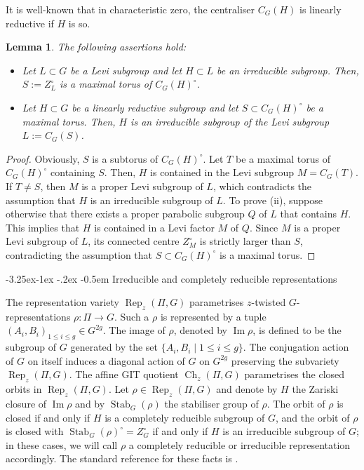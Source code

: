 \documentclass[11pt,oneside,dvipsnames]{amsart}
\makeatletter
\renewcommand\subsection{\@startsection{subsection}{3}{\z@}%
                                     {-3.25ex\@plus -1ex \@minus -.2ex}%
                                     {-0.5em}%
                                     {\normalfont\normalsize\bfseries}}
\theoremstyle{plain}
\newtheorem{Lem}[Thm]{Lemma}
\theoremstyle{definition}
\theoremstyle{named}
\DeclareMathOperator{\Ch}{Ch}
\DeclareMathOperator{\Ima}{Im}
\DeclareMathOperator{\Rep}{Rep}
\DeclareMathOperator{\Stab}{Stab}
\makeatother
\begin{document}
It is well-known that in characteristic zero, the centraliser $C_G(H)$ is linearly reductive if $H$ is so.
\begin{Lem}\label{Lem-S<C_G(H)}
The following assertions hold:
\begin{itemize}
\item[(i)] Let $L\subset G$ be a Levi subgroup and let $H\subset L$ be an irreducible subgroup. Then, $S:=Z_L^{\circ}$ is a maximal torus of $C_G(H)^{\circ}$. 
\item[(ii)] Let $H\subset G$ be a linearly reductive subgroup and let $S\subset C_G(H)^{\circ}$ be a maximal torus. Then, $H$ is an irreducible subgroup of the Levi subgroup $L:=C_G(S)$.
\end{itemize}
\end{Lem}
\begin{proof}
Obviously, $S$ is a subtorus of $C_G(H)^{\circ}$. Let $T$ be a maximal torus of $C_G(H)^{\circ}$ containing $S$. Then, $H$ is contained in the Levi subgroup $M=C_G(T)$. If $T\ne S$, then $M$ is a proper Levi subgroup of $L$, which contradicts the assumption that $H$ is an irreducible subgroup of $L$. To prove (ii), suppose otherwise that there exists a proper parabolic subgroup $Q$ of $L$ that contains $H$. This implies that $H$ is contained in a Levi factor $M$ of $Q$. Since $M$ is a proper Levi subgroup of $L$, its connected centre $Z_M^{\circ}$ is strictly larger than $S$, contradicting the assumption that $S\subset C_G(H)^{\circ}$ is a maximal torus.
\end{proof}

\subsection{Irreducible and completely reducible representations}\label{subsec-rep-char}\hfill

The representation variety $\Rep_z(\Pi,G)$ parametrises $z$-twisted $G$-representations $\rho:\Pi\rightarrow G$. Such a $\rho$ is represented by a tuple $(A_i,B_i)_{1\le i\le g}\in G^{2g}$. The image of $\rho$, denoted by $\Ima\rho$, is defined to be the subgroup of $G$ generated by the set $\{A_i,B_i\mid 1\le i\le g\}$. The conjugation action of $G$ on itself induces a diagonal action of $G$ on $G^{2g}$ preserving the subvariety $\Rep_z(\Pi,G)$. The affine GIT quotient $\Ch_z(\Pi,G)$ parametrises the closed orbits in $\Rep_z(\Pi,G)$. Let $\rho\in \Rep_z(\Pi,G)$ and denote by $H$ the Zariski closure of $\Ima\rho$ and by $\Stab_G(\rho)$ the stabiliser group of $\rho$. The orbit of $\rho$ is closed if and only if $H$ is a completely reducible subgroup of $G$, and the orbit of $\rho$ is closed with $\Stab_G(\rho)^{\circ}=Z_G^{\circ}$ if and only if $H$ is an irreducible subgroup of $G$; in these cases, we will call $\rho$ a completely reducible or irreducible representation accordingly. The standard reference for these facts is \cite[Theorem 3.6 and Theorem 4.1]{Ri88}.
\end{document}
